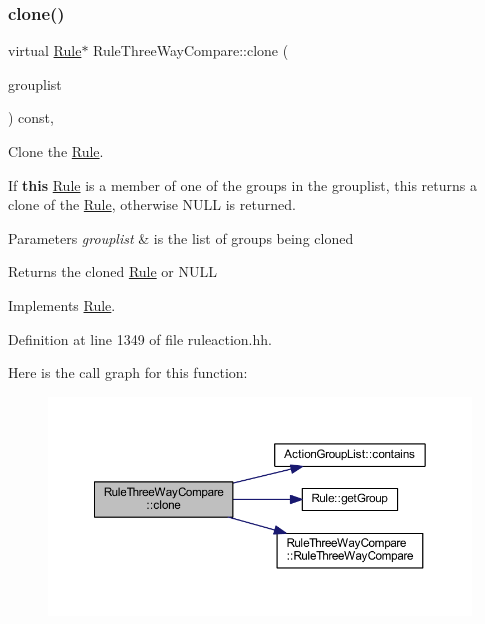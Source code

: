 \subsubsection{\texorpdfstring{clone()}{clone()}}
{\footnotesize\ttfamily virtual \mbox{\hyperlink{class_rule}{Rule}}$\ast$ Rule\+Three\+Way\+Compare\+::clone (\begin{DoxyParamCaption}\item[{const \mbox{\hyperlink{class_action_group_list}{Action\+Group\+List}} \&}]{grouplist }\end{DoxyParamCaption}) const\hspace{0.3cm}{\ttfamily [inline]}, {\ttfamily [virtual]}}



Clone the \mbox{\hyperlink{class_rule}{Rule}}. 

If {\bfseries{this}} \mbox{\hyperlink{class_rule}{Rule}} is a member of one of the groups in the grouplist, this returns a clone of the \mbox{\hyperlink{class_rule}{Rule}}, otherwise N\+U\+LL is returned. 
\begin{DoxyParams}{Parameters}
{\em grouplist} & is the list of groups being cloned \\
\hline
\end{DoxyParams}
\begin{DoxyReturn}{Returns}
the cloned \mbox{\hyperlink{class_rule}{Rule}} or N\+U\+LL 
\end{DoxyReturn}


Implements \mbox{\hyperlink{class_rule_a70de90a76461bfa7ea0b575ce3c11e4d}{Rule}}.



Definition at line 1349 of file ruleaction.\+hh.

Here is the call graph for this function\+:
\nopagebreak
\begin{figure}[H]
\begin{center}
\leavevmode
\includegraphics[width=350pt]{class_rule_three_way_compare_a09b29d9c26493081ff283fa11e845f52_cgraph}
\end{center}
\end{figure}
\mbox{\label{class_rule_three_way_compare_a7f9059f988deedd2d2b13697e4dac1c3}} 
